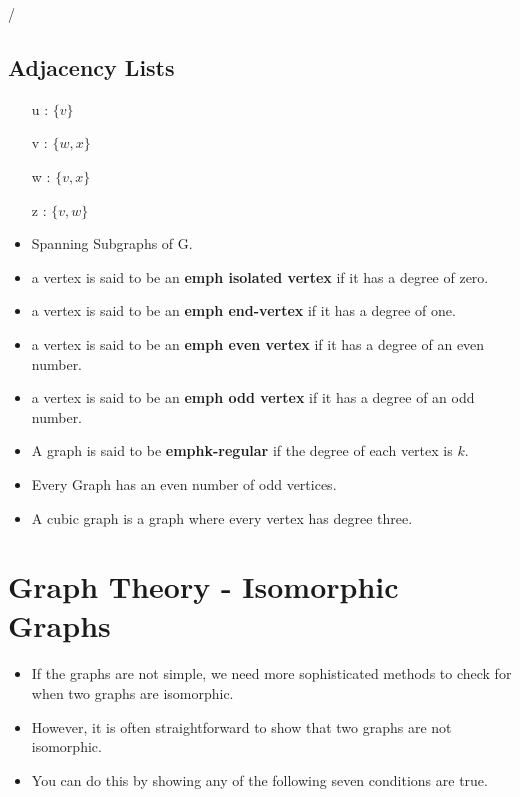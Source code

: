 \documentclass[]{report}
\begin{document}
/


\subsection*{Adjacency Lists}
\begin{itemize}
\item[u]: $\{v\}$
\item[v]: $\{w,x\}$
\item[w]: $\{v,x\}$
\item[z]: $\{v,w\}$
\end{itemize}




\begin{itemize}
\item Spanning Subgraphs of G.

\item a vertex is said to be an \textbf{emph{ isolated vertex}} if it has a degree of zero.
\item a vertex is said to be an \textbf{emph{ end-vertex}} if it has a degree of one.
\item a vertex is said to be an \textbf{emph{ even vertex}} if it has a degree of an even number.
\item a vertex is said to be an \textbf{emph{ odd vertex}} if it has a degree of an odd number.


\item A graph is said to be \textbf{emph{k-regular}} if the degree of each vertex is $k$. 
\item Every Graph has an even number of odd vertices.
\item A cubic graph is a graph where every vertex has degree three.
\end{itemize}
\section{Graph Theory - Isomorphic Graphs}

\begin{itemize}
\item If the graphs are not simple, we need more sophisticated methods to check for when two graphs are isomorphic. 
\item However, it is often straightforward to show that two graphs are not isomorphic. 
\item You can do this by showing any of the following seven conditions are true.
\end{itemize}
\end{document}
